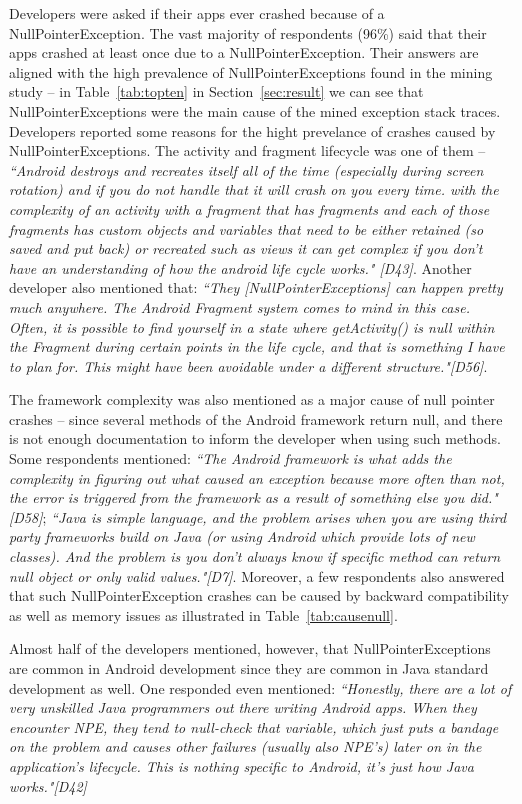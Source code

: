 Developers were asked if their apps ever crashed because of a NullPointerException. The vast majority of respondents (96\%) said that their apps crashed at least once due to a NullPointerException. Their answers are aligned with the high prevalence of NullPointerExceptions found in the mining study -- in Table~\ref{tab:topten} in Section~\ref{sec:result} we can see that NullPointerExceptions were the main cause of the mined exception stack traces. Developers reported some reasons for the hight prevelance of crashes caused by NullPointerExceptions. The activity and fragment lifecycle was one of them -- \emph{``Android destroys and recreates itself all of the time (especially during screen rotation) and if you do not handle that it will crash on you every time. with the complexity of an activity with a fragment that has fragments and each of those fragments has custom objects and variables that need to be either retained (so saved and put back) or recreated such as views it can get complex if you don't have an understanding of how the android life cycle works." [D43]}.  Another developer also mentioned that: \emph{``They [NullPointerExceptions] can happen pretty much anywhere. The Android Fragment system comes to mind in this case. Often, it is possible to find yourself in a state where getActivity() is null within the Fragment during certain points in the life cycle, and that is something I have to plan for. This might have been avoidable under a different structure."[D56]}. 

The framework complexity was also mentioned as a major cause of null pointer crashes -- since several methods of the Android framework return null, and there is not enough documentation to inform the developer when using such methods. Some respondents mentioned: \emph{``The Android framework is what adds the complexity in figuring out what caused an exception because more often than not, the error is triggered from the framework as a result of something else you did." [D58]}; \emph{``Java is simple language, and the problem arises when you are using third party frameworks build on Java (or using Android which provide lots of new classes). And the problem is you don't always know if specific method can return null object or only valid values."[D7]}. Moreover, a few respondents also answered that such NullPointerException crashes can be caused by backward compatibility as well as memory issues as illustrated in Table~\ref{tab:causenull}. 

Almost half of the developers mentioned, however, that NullPointerExceptions are common in Android development since they are common in Java standard development as well. One responded even mentioned: \emph{``Honestly, there are a lot of very unskilled Java programmers out there writing Android apps. When they encounter NPE, they tend to null-check that variable, which just puts a bandage on the problem and causes other failures (usually also NPE's) later on in the application's lifecycle. This is nothing specific to Android, it's just how Java works."[D42]}

